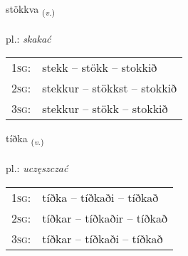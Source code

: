 \documentclass[frontgrid, backgrid]{flacards}\usepackage[]{graphicx}\usepackage[]{xcolor}
\begin{document}
\renewcommand{\flhead}{\vskip5pt \fboxsep=0pt {\small\bfseries\footnotesize Sagnorð | Verb}}
\renewcommand{\fcfoot}{\vskip5pt \fboxsep=0pt \hspace{2pt}{\small\bfseries\footnotesize 2K}}

\renewcommand{\blhead}{\vskip5pt {\small\bfseries\footnotesize Sagnorð | Verb }}
\renewcommand{\bcfoot}{\vskip5pt \hspace{2pt}{\small\bfseries\footnotesize 2K}}


{stökkva \small{\textsubscript{(\textit{v.})}} \\[1ex] %
\textphonetic{[stœhkva]} \\
pl.: \emph{skakać} \\  [2ex]
\renewcommand*{\arraystretch}{0.8}
\begin{tabular}{p{1cm}l}
\textsc{1sg}: & stekk -- stökk -- stokkið \\ 
\textsc{2sg}: & stekkur -- stökkst -- stokkið \\ 
\textsc{3sg}: & stekkur -- stökk -- stokkið \\ 
\end{tabular}
}

\renewcommand{\flhead}{\vskip5pt \fboxsep=0pt {\small\bfseries\footnotesize Sagnorð | Verb}}
\renewcommand{\fcfoot}{\vskip5pt \fboxsep=0pt \hspace{2pt}{\small\bfseries\footnotesize 2K}}

\renewcommand{\blhead}{\vskip5pt {\small\bfseries\footnotesize Sagnorð | Verb }}
\renewcommand{\bcfoot}{\vskip5pt \hspace{2pt}{\small\bfseries\footnotesize 2K}}


{tíðka \small{\textsubscript{(\textit{v.})}} \\[1ex] %
\textphonetic{[tʰiθka]} \\
pl.: \emph{uczęszczać} \\  [2ex]
\renewcommand*{\arraystretch}{0.8}
\begin{tabular}{p{1cm}l}
\textsc{1sg}: & tíðka -- tíðkaði -- tíðkað \\ 
\textsc{2sg}: & tíðkar -- tíðkaðir -- tíðkað \\ 
\textsc{3sg}: & tíðkar -- tíðkaði -- tíðkað \\ 
\end{tabular}
}
\end{document}
